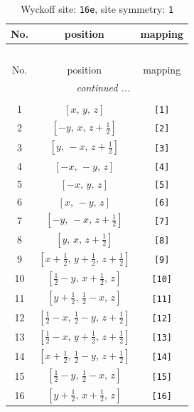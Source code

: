 \documentclass[fleqn,8pt]{jsarticle}
\begin{document}
\begin{longtable}{ccc}
\caption{Wyckoff site: {\tt 16e}, site symmetry: {\tt 1}}
 \\
 \hline \hline
No. & position & mapping \\ \hline \endfirsthead

\multicolumn{2}{l}{\tablename\ \thetable{}} \\
 \hline \hline
No. & position & mapping \\ \hline \endhead

 \hline \hline
\multicolumn{2}{r}{\footnotesize\it continued ...} \\ \endfoot

 \hline \hline
\multicolumn{2}{r}{} \\ \endlastfoot

1 & $\left[ x,\, y,\, z \right]$ & {\tt [1]} \\ \hline
2 & $\left[ - y,\, x,\, z + \frac{1}{2} \right]$ & {\tt [2]} \\ \hline
3 & $\left[ y,\, - x,\, z + \frac{1}{2} \right]$ & {\tt [3]} \\ \hline
4 & $\left[ - x,\, - y,\, z \right]$ & {\tt [4]} \\ \hline
5 & $\left[ - x,\, y,\, z \right]$ & {\tt [5]} \\ \hline
6 & $\left[ x,\, - y,\, z \right]$ & {\tt [6]} \\ \hline
7 & $\left[ - y,\, - x,\, z + \frac{1}{2} \right]$ & {\tt [7]} \\ \hline
8 & $\left[ y,\, x,\, z + \frac{1}{2} \right]$ & {\tt [8]} \\ \hline
9 & $\left[ x + \frac{1}{2},\, y + \frac{1}{2},\, z + \frac{1}{2} \right]$ & {\tt [9]} \\ \hline
10 & $\left[ \frac{1}{2} - y,\, x + \frac{1}{2},\, z \right]$ & {\tt [10]} \\ \hline
11 & $\left[ y + \frac{1}{2},\, \frac{1}{2} - x,\, z \right]$ & {\tt [11]} \\ \hline
12 & $\left[ \frac{1}{2} - x,\, \frac{1}{2} - y,\, z + \frac{1}{2} \right]$ & {\tt [12]} \\ \hline
13 & $\left[ \frac{1}{2} - x,\, y + \frac{1}{2},\, z + \frac{1}{2} \right]$ & {\tt [13]} \\ \hline
14 & $\left[ x + \frac{1}{2},\, \frac{1}{2} - y,\, z + \frac{1}{2} \right]$ & {\tt [14]} \\ \hline
15 & $\left[ \frac{1}{2} - y,\, \frac{1}{2} - x,\, z \right]$ & {\tt [15]} \\ \hline
16 & $\left[ y + \frac{1}{2},\, x + \frac{1}{2},\, z \right]$ & {\tt [16]} \\
\end{longtable}
\end{document}
